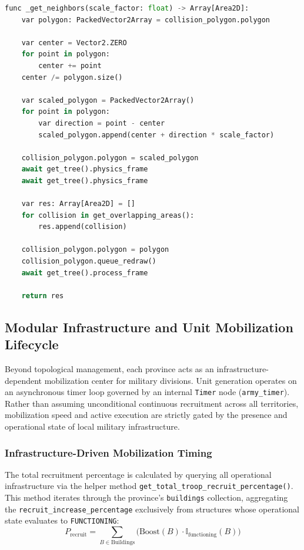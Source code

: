 \begin{lstlisting}[language=python, caption={Asynchronous topological neighbor discovery via centroid-based polygon expansion.}, label={lst:neighbor_discovery}]
func _get_neighbors(scale_factor: float) -> Array[Area2D]:
    var polygon: PackedVector2Array = collision_polygon.polygon

    var center = Vector2.ZERO
    for point in polygon:
        center += point
    center /= polygon.size()

    var scaled_polygon = PackedVector2Array()
    for point in polygon:
        var direction = point - center
        scaled_polygon.append(center + direction * scale_factor)

    collision_polygon.polygon = scaled_polygon
    await get_tree().physics_frame
    await get_tree().physics_frame

    var res: Array[Area2D] = []
    for collision in get_overlapping_areas():
        res.append(collision)

    collision_polygon.polygon = polygon
    collision_polygon.queue_redraw()
    await get_tree().process_frame

    return res
\end{lstlisting}

\subsection{Modular Infrastructure and Unit Mobilization Lifecycle}
\label{subsec:unit_recruitment}

Beyond topological management, each province acts as an infrastructure-dependent mobilization center for military divisions. Unit generation operates on an asynchronous timer loop governed by an internal \texttt{Timer} node (\texttt{army\_timer}). Rather than assuming unconditional continuous recruitment across all territories, mobilization speed and active execution are strictly gated by the presence and operational state of local military infrastructure.

\subsubsection{Infrastructure-Driven Mobilization Timing}
The total recruitment percentage is calculated by querying all operational infrastructure via the helper method \texttt{get\_total\_troop\_recruit\_percentage()}. This method iterates through the province's \texttt{buildings} collection, aggregating the \texttt{recruit\_increase\_percentage} exclusively from structures whose operational state evaluates to \texttt{FUNCTIONING}:
\begin{equation}
    P_{\text{recruit}} = \sum_{B \in \text{Buildings}} \Big( \text{Boost}(B) \cdot \mathbb{I}_{\text{functioning}}(B) \Big)
\end{equation}


